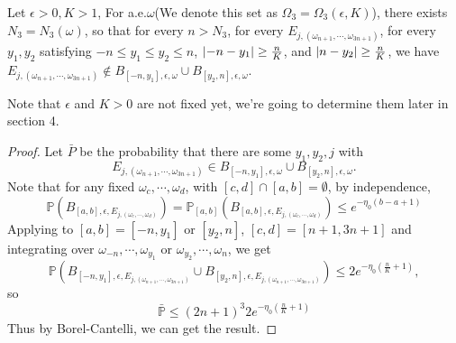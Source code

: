 \begin{lemma}\label{omega3}
   Let $\epsilon>0,K>1$, For a.e.$\omega$(We denote this set as $\Omega_3=\Omega_3(\epsilon,K)$), there exists $ N_3=N_3(\omega)$, so that for every $ n>N_3$, for every $ E_{j,(\omega_{n+1},\cdots,\omega_{3n+1})}$, for every $ y_1,y_2$ satisfying $-n\leq y_1\leq y_2\leq n$,  $\lvert-n-y_1\rvert\geq\frac{n}{K}$, and $\lvert n-y_2\rvert\geq\frac{n}{K}$,
 we have $E_{j,(\omega_{n+1},\cdots,\omega_{3n+1})}\notin B_{[-n,y_1],\epsilon,\omega}\cup B_{[y_2,n],\epsilon,\omega}$.
\end{lemma}
\begin{remark}
  Note that $\epsilon$ and $K>0$ are not fixed yet, we're going to determine them later in section 4.
\end{remark}
\begin{proof}
Let $\bar{P}$
be the probability that there are some $y_1, y_2, j$ with \[
E_{j,(\omega_{n+1},\cdots,\omega_{3n+1})}\in B_{[-n,y_1],\epsilon,\omega}\cup B_{[y_2,n],\epsilon,\omega}.
\] Note that for any fixed $\omega_c,\cdots,\omega_d $, with $[c,d]\cap[a,b]=\emptyset$, by independence,
\[
\mathbb{P}(B_{[a,b],\epsilon,E_{j,(\omega_c,\cdots,\omega_d)}})=\mathbb{P}_{[a,b]}(B_{[a,b],\epsilon,E_{j,(\omega_c,\cdots,\omega_d)}})\leq e^{-\eta_0(b-a+1)}
\]
Applying to $[a,b]=[-n,y_1]$ or $[y_2,n]$, $[c,d]=[n+1,3n+1]$ and integrating over $\omega_{-n},\cdots,\omega_{y_1}$ or $\omega_{y_2},\cdots,\omega_{n}$, we get
\[
\mathbb{P}(B_{[-n,y_1],\epsilon,E_{j,(\omega_{n+1},\cdots,\omega_{3n+1})}}\cup B_{[y_2,n],\epsilon,E_{j,(\omega_{n+1},\cdots,\omega_{3n+1})}}) \leq 2e^{-\eta_0(\frac{n}{K}+1)},
\]
so
\[
\bar{\mathbb{P}}\leq(2n+1)^3 2e^{-\eta_0(\frac{n}{K}+1)}
\]
Thus by Borel-Cantelli, we can get the result.


\end{proof}
